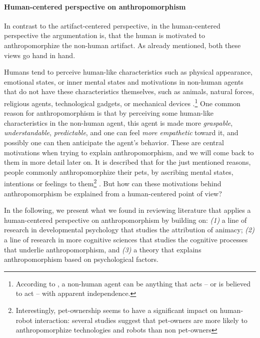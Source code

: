\documentclass{frontiersSCNS} %
\begin{document}

\paragraph{Human-centered perspective on anthropomorphism}

In contrast to the artifact-centered perspective, in the human-centered perspective the argumentation is, that the human is motivated to anthropomorphize the non-human artifact. As already mentioned, both these views go hand in hand.

Humans tend to perceive human-like characteristics such as physical appearance, emotional states, or inner mental states and motivations in non-human agents that do not have these characteristics themselves, such as animals, natural forces, religious agents, technological gadgets, or mechanical devices \citep{epley_when_2008}.\footnote{According to \cite{epley_when_2008}, a non-human agent can be anything that acts -- or is believed to act -- with apparent independence.} 
One common reason for anthropomorphism is that by perceiving some human-like characteristics in the non-human agent, this agent is made more \emph{graspable}, \emph{understandable}, \emph{predictable}, and one can feel \emph{more empathetic} toward it, and possibly one can then anticipate the agent's behavior. These are central motivations when trying to explain anthropomorphism, and we will come back to them in more detail later on. 
It is described that for the just mentioned reasons, people commonly anthropomorphize their pets, by ascribing mental states, intentions or feelings to them\footnote{Interestingly, pet-ownership seems to have a significant impact on human-robot interaction: several studies suggest that pet-owners are more likely to anthropomorphize technologies and robots than non pet-owners} \cite{eddy_attribution_1993}. But how can these motivations behind anthropomorphism be explained from a human-centered point of view?

In the following, we present what we found in reviewing literature that applies a human-centered perspective on anthropomorphism by building on:
\textit{(1)} a line of research in developmental psychology that studies the attribution of animacy;
\textit{(2)} a line of research in more cognitive sciences that studies the cognitive processes that underlie anthropomorphism, and
\textit{(3)} a theory that explains anthropomorphism based on psychological factors. 
\end{document}
